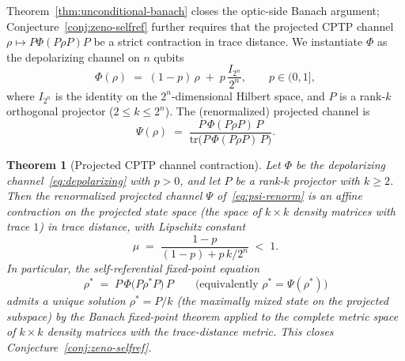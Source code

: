 \documentclass[11pt,a4paper]{article}
\theoremstyle{plain}
\newtheorem{theorem}{Theorem}[section]
\theoremstyle{definition}
\theoremstyle{remark}
\begin{document}
Theorem~\ref{thm:unconditional-banach} closes the optic-side Banach
argument; Conjecture~\ref{conj:zeno-selfref} further requires that
the projected CPTP channel $\rho\mapsto P\Phi(P\rho P)P$ be a strict
contraction in trace distance. We instantiate $\Phi$ as the
depolarizing channel on $n$ qubits
\begin{equation}\label{eq:depolarizing}
  \Phi(\rho) \;=\; (1-p)\,\rho \;+\; p\,\frac{I_{2^{n}}}{2^{n}},
  \qquad p\in(0,1],
\end{equation}
where $I_{2^{n}}$ is the identity on the $2^{n}$-dimensional Hilbert
space, and $P$ is a rank-$k$ orthogonal projector ($2\leq k\leq 2^{n}$).
The (renormalized) projected channel is
\begin{equation}\label{eq:psi-renorm}
  \Psi(\rho) \;=\; \frac{P\,\Phi(P\rho P)\,P}{\mathrm{tr}\!\bigl(P\,\Phi(P\rho P)\,P\bigr)}.
\end{equation}

\begin{theorem}[Projected CPTP channel contraction]
\label{thm:zeno-contraction}
Let $\Phi$ be the depolarizing channel~\eqref{eq:depolarizing} with
$p>0$, and let $P$ be a rank-$k$ projector with $k\geq 2$. Then the
renormalized projected channel $\Psi$ of~\eqref{eq:psi-renorm} is an
affine contraction on the projected state space (the space of $k\times
k$ density matrices with trace $1$) in trace distance, with Lipschitz
constant
\begin{equation}\label{eq:mu-theory}
  \mu \;=\; \frac{1-p}{(1-p)+p\,k/2^{n}} \;<\; 1.
\end{equation}
In particular, the self-referential fixed-point equation
\begin{equation}\label{eq:zeno-fixed-eq}
  \rho^{*} \;=\; P\,\Phi\!\bigl(P\rho^{*}P\bigr)\,P
  \qquad\text{(equivalently } \rho^{*}=\Psi(\rho^{*})\text{)}
\end{equation}
admits a unique solution $\rho^{*}=P/k$ (the maximally mixed state on
the projected subspace) by the Banach fixed-point theorem applied to
the complete metric space of $k\times k$ density matrices with the
trace-distance metric. This closes
Conjecture~\ref{conj:zeno-selfref}.
\end{theorem}
\end{document}
